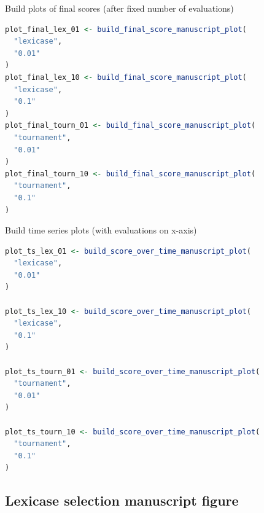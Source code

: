 \documentclass[
]{book}
\begin{document}
Build plots of final scores (after fixed number of evaluations)

\begin{lstlisting}[language=R]
plot_final_lex_01 <- build_final_score_manuscript_plot(
  "lexicase",
  "0.01"
)
plot_final_lex_10 <- build_final_score_manuscript_plot(
  "lexicase",
  "0.1"
)
plot_final_tourn_01 <- build_final_score_manuscript_plot(
  "tournament",
  "0.01"
)
plot_final_tourn_10 <- build_final_score_manuscript_plot(
  "tournament",
  "0.1"
)
\end{lstlisting}

Build time series plots (with evaluations on x-axis)

\begin{lstlisting}[language=R]
plot_ts_lex_01 <- build_score_over_time_manuscript_plot(
  "lexicase",
  "0.01"
)

plot_ts_lex_10 <- build_score_over_time_manuscript_plot(
  "lexicase",
  "0.1"
)

plot_ts_tourn_01 <- build_score_over_time_manuscript_plot(
  "tournament",
  "0.01"
)

plot_ts_tourn_10 <- build_score_over_time_manuscript_plot(
  "tournament",
  "0.1"
)
\end{lstlisting}

\hypertarget{lexicase-selection-manuscript-figure}{%
\subsection{Lexicase selection manuscript figure}\label{lexicase-selection-manuscript-figure}}
\end{document}
